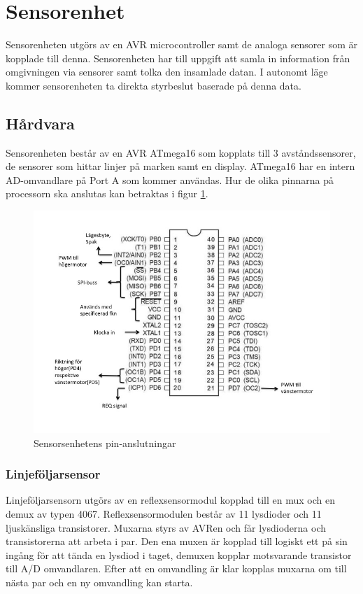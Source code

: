 \section{Sensorenhet}
Sensorenheten utgörs av en AVR microcontroller samt de analoga sensorer som är kopplade till denna. Sensorenheten har till uppgift att samla in information från omgivningen via sensorer samt tolka den insamlade datan. I autonomt läge kommer sensorenheten ta direkta styrbeslut baserade på denna data. 

\subsection{Hårdvara}
Sensorenheten består av en AVR ATmega16 som kopplats till 3 avståndssensorer, de sensorer som hittar linjer på marken samt en display. ATmega16 har en intern AD-omvandlare på Port A som kommer användas. Hur de olika pinnarna på processorn ska anslutas kan betraktas i figur 
\ref{fig:PINsensor}.

\begin{figure}[H]
  \centering
 \includegraphics[angle=0,scale=0.5]{bilder/PIN_styr.jpg}
  \caption{Sensorsenhetens pin-anslutningar}
  \label{fig:PINsensor}
\end{figure}

\subsubsection{Linjeföljarsensor}
Linjeföljarsensorn utgörs av en reflexsensormodul kopplad till en mux och en demux av typen 4067. Reflexsensormodulen består av 11 lysdioder och 11 ljuskänsliga transistorer. Muxarna styrs av AVRen och får lysdioderna och transistorerna att arbeta i par. Den ena muxen är kopplad till logiskt ett på sin ingång för att tända en lysdiod i taget, demuxen kopplar motsvarande transistor till A/D omvandlaren. Efter att en omvandling är klar kopplas muxarna om till nästa par och en ny omvandling kan starta.


